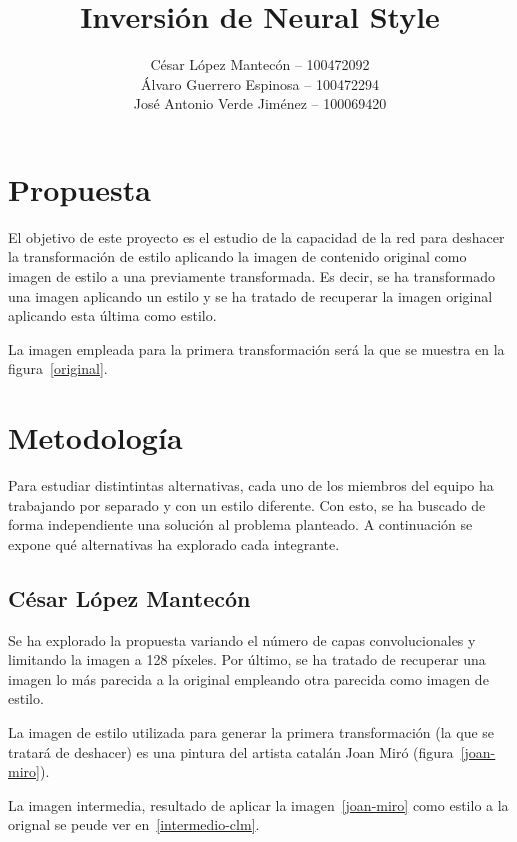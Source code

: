 \documentclass[es]{uc3mreport}
\author{
    César López Mantecón  -- 100472092\\
    Álvaro Guerrero Espinosa -- 100472294\\
    José Antonio Verde Jiménez -- 100069420}
\title{Inversión de Neural Style}
\begin{document}
    \makecover


    \begin{report}
        \section{Propuesta}
        El objetivo de este proyecto es el estudio de la capacidad de la red
        para deshacer la transformación de estilo aplicando la imagen de
            contenido original como imagen de estilo a una previamente
            transformada. Es decir, se ha transformado una imagen aplicando un
            estilo y se ha tratado de recuperar la imagen original aplicando
            esta última como estilo.

        La imagen empleada para la primera transformación será la que se muestra en la figura~\ref{original}.


        \section{Metodología}
        Para estudiar distintintas alternativas, cada uno de los miembros del
        equipo ha trabajando por separado y con un estilo diferente. Con esto, se ha buscado de forma
        independiente una solución al problema planteado. A continuación se
        expone qué alternativas ha explorado cada integrante.

            

            \subsection{César López Mantecón}
            Se ha explorado la propuesta variando el número de capas
            convolucionales y limitando la imagen a 128 píxeles. Por último, se
            ha tratado de recuperar una imagen lo más parecida a la original
            empleando otra parecida como imagen de estilo.

            La imagen de estilo utilizada para generar la primera
            transformación (la que se tratará de deshacer) es una pintura del
            artista catalán Joan Miró (figura~\ref{joan-miro}).

            La imagen intermedia, resultado de aplicar la
            imagen~\ref{joan-miro} como estilo a la orignal se peude ver
            en~\ref{intermedio-clm}.


\end{report}
\end{document}
